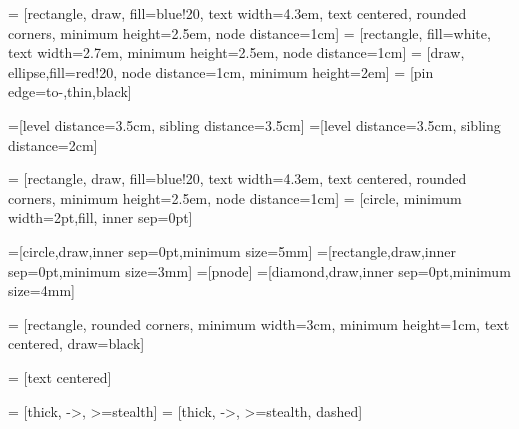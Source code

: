 \usepackage{tikz}
\usetikzlibrary{arrows,shapes,backgrounds,shapes.geometric}
\usetikzlibrary{trees}
\usetikzlibrary{positioning}
\usetikzlibrary{calc}

\usepackage{arrayjobx}		%
\usepackage{trimspaces}		%
\usepackage{xifthen}		%


\usetikzlibrary{shapes}

 = [rectangle, draw, fill=blue!20, 
text width=4.3em, text centered, rounded corners, minimum height=2.5em, node distance=1cm]
 = [rectangle, fill=white, 
text width=2.7em, minimum height=2.5em, node distance=1cm]
 = [draw, ellipse,fill=red!20, node distance=1cm,
minimum height=2em]
 = [pin edge={to-,thin,black}]

=[level distance=3.5cm, sibling distance=3.5cm]
=[level distance=3.5cm, sibling distance=2cm]

 = [rectangle, draw, fill=blue!20, 
text width=4.3em, text centered, rounded corners, minimum height=2.5em, node distance=1cm]
 = [circle, minimum width=2pt,fill, inner sep=0pt]

=[circle,draw,inner sep=0pt,minimum size=5mm]
=[rectangle,draw,inner sep=0pt,minimum size=3mm]
=[pnode]
=[diamond,draw,inner sep=0pt,minimum size=4mm]

\usetikzlibrary{arrows.meta}

 = [rectangle, rounded corners, minimum width=3cm, minimum height=1cm, text centered, 
draw=black]

 =  [text centered]

 =       [thick, ->, >=stealth]
 = [thick, ->, >=stealth, dashed]

\usepackage{interval}

\usepackage{slashed}            %
\usepackage{tikz} %
\usetikzlibrary{shapes,calc,matrix,arrows.meta,3d,quotes,positioning,fit}

